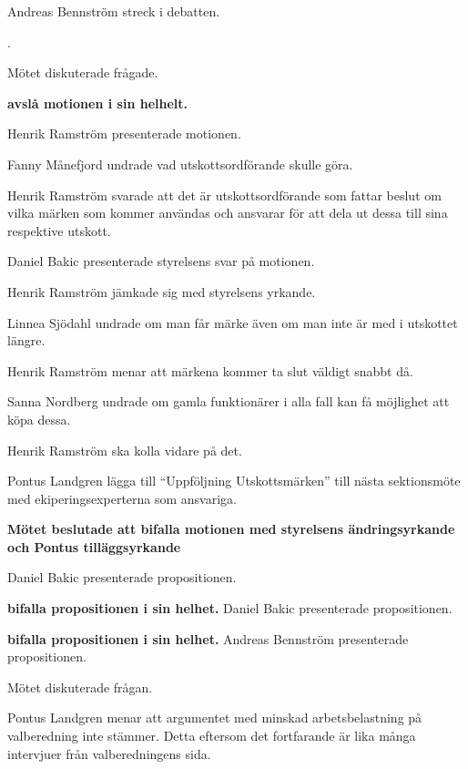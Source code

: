 \documentclass[10pt]{article}
\begin{document}
\begin{paragrafer}
\begin{paragrafer}
		Andreas Bennström \ypa streck i debatten.

		\Mbaby.

		Mötet diskuterade frågade.

		\textbf{\Mba avslå motionen i sin helhelt.}


		Henrik Ramström presenterade motionen.

		Fanny Månefjord undrade vad utskottsordförande skulle göra.

		Henrik Ramström svarade att det är utskottsordförande som fattar beslut om vilka märken som kommer användas och ansvarar för att dela ut dessa till sina respektive utskott.

		Daniel Bakic presenterade styrelsens svar på motionen.

		Henrik Ramström jämkade sig med styrelsens yrkande.

		Linnea Sjödahl undrade om man får märke även om man inte är med i utskottet längre.

		Henrik Ramström menar att märkena kommer ta slut väldigt snabbt då.

		Sanna Nordberg undrade om gamla funktionärer i alla fall kan få möjlighet att köpa dessa.

		Henrik Ramström ska kolla vidare på det.

		Pontus Landgren \ypa lägga till ``Uppföljning Utskottsmärken'' till nästa sektionsmöte med ekiperingsexperterna som ansvariga.

		\textbf{Mötet beslutade att bifalla motionen med styrelsens ändringsyrkande och Pontus tilläggsyrkande}
	\end{paragrafer}

	\begin{paragrafer}

		Daniel Bakic presenterade propositionen.

		\textbf{\Mba bifalla propositionen i sin helhet.}
		Daniel Bakic presenterade propositionen.

		\textbf{\Mba bifalla propositionen i sin helhet.}
		Andreas Bennström presenterade propositionen.

		Mötet diskuterade frågan.

		Pontus Landgren menar att argumentet med minskad arbetsbelastning på valberedning inte stämmer. Detta eftersom det fortfarande är lika många intervjuer från valberedningens sida.


\end{paragrafer}
\end{paragrafer}
\end{document}

